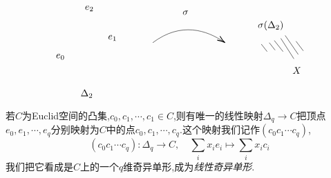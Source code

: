 \documentclass{article}
\begin{document}
\[\begin{tikzpicture}[x=0.75pt,y=0.75pt,yscale=-1,xscale=1]
\draw    (360,141) -- (368.11,151.33) ;
\draw    (371,139) -- (379.11,149.33) ;
\draw    (378,136) -- (390.11,151.33) ;
\draw    (387,133) -- (405.11,161.33) ;
\draw    (393,129) -- (411.11,155.33) ;
\draw    (408,137) -- (418.11,150.33) ;
\draw    (210,139) .. controls (249.2,109.6) and (284.67,121.82) .. (308.55,138) ;
\draw [shift={(310,139)}, rotate = 214.9] [color={rgb, 255:red, 0; green, 0; blue, 0 }  ][line width=0.75]    (10.93,-3.29) .. controls (6.95,-1.4) and (3.31,-0.3) .. (0,0) .. controls (3.31,0.3) and (6.95,1.4) .. (10.93,3.29)   ;

\draw (75,153.4) node [anchor=north west][inner sep=0.75pt]    {$e_{0}$};
\draw (147,127.4) node [anchor=north west][inner sep=0.75pt]    {$e_{1}$};
\draw (115,86.4) node [anchor=north west][inner sep=0.75pt]    {$e_{2}$};
\draw (109,202.4) node [anchor=north west][inner sep=0.75pt]    {$\Delta _{2}$};
\draw (402,171.4) node [anchor=north west][inner sep=0.75pt]    {$X$};
\draw (354,107.4) node [anchor=north west][inner sep=0.75pt]    {$\sigma ( \Delta _{2})$};
\draw (250,93.4) node [anchor=north west][inner sep=0.75pt]    {$\sigma $};


\end{tikzpicture}\]
\begin{example}
    若$C$为Euclid空间的凸集,$c_0,c_1,\cdots,c_1 \in C$,则有唯一的线性映射$\Delta_q \to C$把顶点$e_0,e_1,\cdots,e_q$分别映射为$C$中的点$c_0,c_1,\cdots,c_q$.这个映射我们记作$(c_0c_1\cdots c_q)$,
    $$
    (c_0c_1\cdots c_q) : \Delta_q \to C, \quad\sum_{i} x_i e_i \mapsto \sum_i x_i c_i
    $$
    我们把它看成是$C$上的一个$q$维奇异单形,成为\emph{线性奇异单形}.
\end{example}
\end{document}

